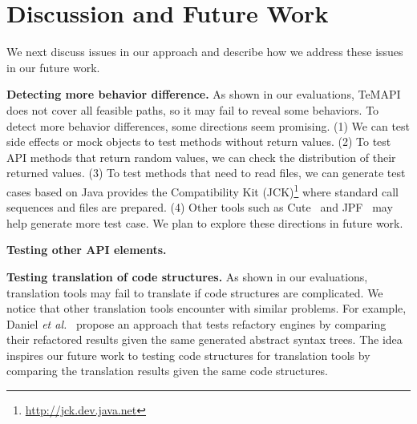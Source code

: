 

\section{Discussion and Future Work}
\label{sec:discuss}

We next discuss issues in our approach and describe how we address
these issues in our future work.

\textbf{Detecting more behavior difference.} As shown in our evaluations, TeMAPI does not cover all feasible paths, so it may fail to reveal some behaviors. To detect more behavior differences, some directions seem promising. (1) We can test side effects or  mock objects to test methods without return values. (2) To test API methods that return random values, we can check the distribution of their returned values. (3) To test methods that need to read files, we can generate test cases based on Java provides the Compatibility Kit (JCK)\footnote{\url{http://jck.dev.java.net}} where standard call sequences and files are prepared. (4) Other tools such as Cute~\cite{koushik:cute} and JPF~\cite{visser2003mcp} may help generate more test case. We plan to explore these directions in future work.

\textbf{Testing other API elements.}

\textbf{Testing translation of code structures.} As shown in our evaluations, translation tools may fail to translate if code structures are complicated. We notice that other translation tools encounter with similar problems. For example, Daniel \emph{et al.}~\cite{daniel2007automated} propose an approach that tests refactory engines by comparing their refactored results given the same generated abstract syntax trees. The idea inspires our future work to testing code structures for translation tools by comparing the translation results given the same code structures.

